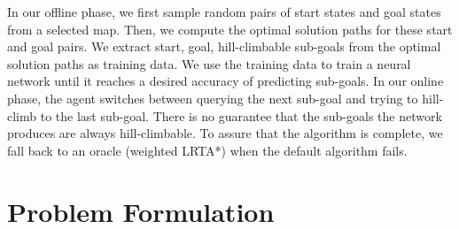 \documentclass[letterpaper]{article}
\numberwithin{equation}{section}
\numberwithin{theorem}{section}
\numberwithin{lemma}{section}
\numberwithin{df}{section}
\begin{document}
    In our offline phase, we first sample random pairs of start states and goal states from a selected map.
    Then, we compute the optimal solution paths for these start and goal pairs.
    We extract start, goal, hill-climbable sub-goals from the optimal solution paths as training data.
    We use the training data to train a neural network until it reaches a desired accuracy of predicting sub-goals.
    In our online phase, the agent switches between querying the next sub-goal and trying to hill-climb to the last sub-goal.
    There is no guarantee that the sub-goals the network produces are always hill-climbable.
    To assure that the algorithm is complete, we fall back to an oracle (weighted LRTA*) when the default algorithm fails.

%
%
%


    \section{Problem Formulation}\label{sec:problem-formulation}
\end{document}

